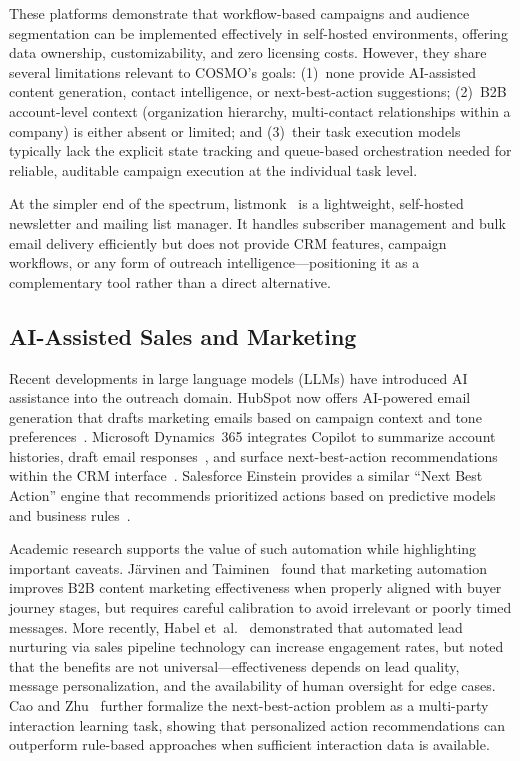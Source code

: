 These platforms demonstrate that workflow-based campaigns and audience segmentation can be implemented effectively in self-hosted environments, offering data ownership, customizability, and zero licensing costs. However, they share several limitations relevant to COSMO's goals: (1)~none provide AI-assisted content generation, contact intelligence, or next-best-action suggestions; (2)~B2B account-level context (organization hierarchy, multi-contact relationships within a company) is either absent or limited; and (3)~their task execution models typically lack the explicit state tracking and queue-based orchestration needed for reliable, auditable campaign execution at the individual task level.

At the simpler end of the spectrum, listmonk~\cite{listmonk_github} is a lightweight, self-hosted newsletter and mailing list manager. It handles subscriber management and bulk email delivery efficiently but does not provide CRM features, campaign workflows, or any form of outreach intelligence---positioning it as a complementary tool rather than a direct alternative.

\subsection{AI-Assisted Sales and Marketing}

Recent developments in large language models (LLMs) have introduced AI assistance into the outreach domain. HubSpot now offers AI-powered email generation that drafts marketing emails based on campaign context and tone preferences~\cite{hubspot_ai_email_creation}. Microsoft Dynamics~365 integrates Copilot to summarize account histories, draft email responses~\cite{ms_copilot_email_draft}, and surface next-best-action recommendations within the CRM interface~\cite{ms_d365_copilot_overview}. Salesforce Einstein provides a similar ``Next Best Action'' engine that recommends prioritized actions based on predictive models and business rules~\cite{salesforce_nba_about, salesforce_nba_get_started}.

Academic research supports the value of such automation while highlighting important caveats. J\"{a}rvinen and Taiminen~\cite{jarvinen2016marketingautomation} found that marketing automation improves B2B content marketing effectiveness when properly aligned with buyer journey stages, but requires careful calibration to avoid irrelevant or poorly timed messages. More recently, Habel et~al.~\cite{habel2025aln} demonstrated that automated lead nurturing via sales pipeline technology can increase engagement rates, but noted that the benefits are not universal---effectiveness depends on lead quality, message personalization, and the availability of human oversight for edge cases. Cao and Zhu~\cite{cao2022nba} further formalize the next-best-action problem as a multi-party interaction learning task, showing that personalized action recommendations can outperform rule-based approaches when sufficient interaction data is available.

